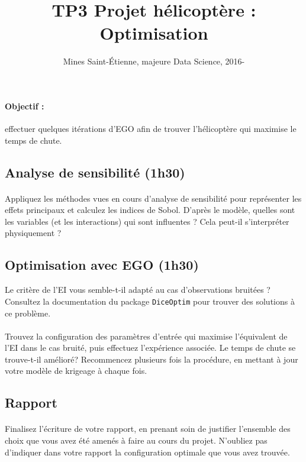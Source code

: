 \documentclass[a4paper,10pt]{article}
\title{\vspace{-1cm} TP3 Projet hélicoptère : Optimisation}
\author{Mines Saint-\'Etienne, majeure Data Science,  2016\:-\:2017 }
\date{}
\begin{document}
\maketitle
\paragraph{Objectif :} effectuer quelques itérations d'EGO afin de trouver l'hélicoptère qui maximise le temps de chute.

\subsection*{Analyse de sensibilité (1h30)}
\paragraph{}
Appliquez les méthodes vues en cours d'analyse de sensibilité pour représenter les effets principaux et calculez les indices de Sobol. D'après le modèle, quelles sont les variables (et les interactions) qui sont influentes ? Cela peut-il s'interpréter physiquement ?

\subsection*{Optimisation avec EGO (1h30)}
Le critère de l'EI vous semble-t-il adapté au cas d'observations bruitées ? Consultez la documentation du package \texttt{DiceOptim} pour trouver des solutions à ce problème. 

\paragraph{}
Trouvez la configuration des paramètres d'entrée qui maximise l'équivalent de l'EI dans le cas bruité, puis effectuez l'expérience associée. Le temps de chute se trouve-t-il amélioré? Recommencez plusieurs fois la procédure, en mettant à jour votre modèle de krigeage à chaque fois. 

\subsection*{Rapport}
\paragraph{}
Finalisez l'écriture de votre rapport, en prenant soin de justifier l'ensemble des choix que vous avez été amenés à faire au cours du projet. N'oubliez pas d'indiquer dans votre rapport la configuration optimale que vous avez trouvée.
\end{document}
